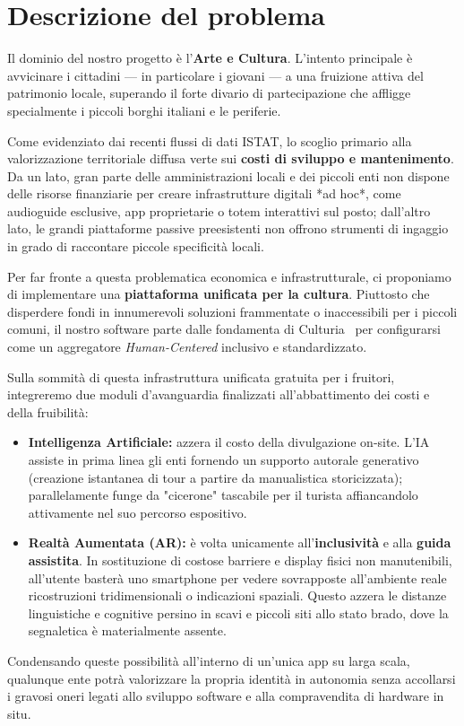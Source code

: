 \section{Descrizione del problema}

Il dominio del nostro progetto è l'\textbf{Arte e Cultura}. L'intento principale è avvicinare i cittadini — in particolare i giovani — a una fruizione attiva del patrimonio locale, superando il forte divario di partecipazione che affligge specialmente i piccoli borghi italiani e le periferie.

Come evidenziato dai recenti flussi di dati ISTAT, lo scoglio primario alla valorizzazione territoriale diffusa verte sui \textbf{costi di sviluppo e mantenimento}. Da un lato, gran parte delle amministrazioni locali e dei piccoli enti non dispone delle risorse finanziarie per creare infrastrutture digitali *ad hoc*, come audioguide esclusive, app proprietarie o totem interattivi sul posto; dall'altro lato, le grandi piattaforme passive preesistenti non offrono strumenti di ingaggio in grado di raccontare piccole specificità locali.

Per far fronte a questa problematica economica e infrastrutturale, ci proponiamo di implementare una \textbf{piattaforma unificata per la cultura}. Piuttosto che disperdere fondi in innumerevoli soluzioni frammentate o inaccessibili per i piccoli comuni, il nostro software parte dalle fondamenta di Culturia~\cite{culturia_repo} per configurarsi come un aggregatore \textit{Human-Centered} inclusivo e standardizzato.

Sulla sommità di questa infrastruttura unificata gratuita per i fruitori, integreremo due moduli d'avanguardia finalizzati all'abbattimento dei costi e della fruibilità:

\begin{itemize}
    \item \textbf{Intelligenza Artificiale:} azzera il costo della divulgazione on-site. L'IA assiste in prima linea gli enti fornendo un supporto autorale generativo (creazione istantanea di tour a partire da manualistica storicizzata); parallelamente funge da "cicerone" tascabile per il turista affiancandolo attivamente nel suo percorso espositivo.
    \item \textbf{Realtà Aumentata (AR):} è volta unicamente all'\textbf{inclusività} e alla \textbf{guida assistita}. In sostituzione di costose barriere e display fisici non manutenibili, all'utente basterà uno smartphone per vedere sovrapposte all'ambiente reale ricostruzioni tridimensionali o indicazioni spaziali. Questo azzera le distanze linguistiche e cognitive persino in scavi e piccoli siti allo stato brado, dove la segnaletica è materialmente assente.
\end{itemize}

Condensando queste possibilità all'interno di un'unica app su larga scala, qualunque ente potrà valorizzare la propria identità in autonomia senza accollarsi i gravosi oneri legati allo sviluppo software e alla compravendita di hardware in situ.

